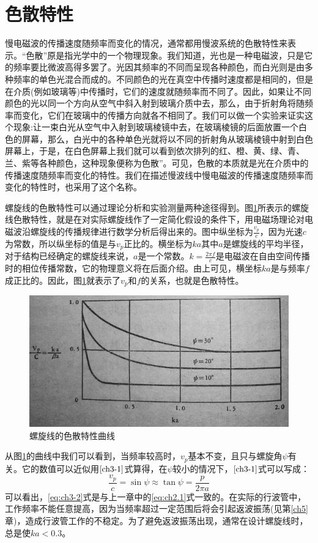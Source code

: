 \section{色散特性}
慢电磁波的传播速度随频率而变化的情况，通常都用慢波系统的色散特性来表示。“色散”原是指光学中的一个物理现象。我们知道，光也是一种电磁波，只是它的频率要比微波高得多罢了。光因其频率的不同而呈现各种颜色，而白光则是由多种频率的单色光混合而成的。不同颜色的光在真空中传播时速度都是相同的，但是在介质(例如玻璃等)中传播时，它们的速度就随频率而不同了。因此，如果让不同颜色的光以同一个方向从空气中斜入射到玻璃介质中去，那么，由于折射角将随频率而变化，它们在玻璃中的传播方向就各不相同了。我们可以做一个实验来证实这个现象:让一束白光从空气中入射到玻璃棱镜中去，在玻璃棱镜的后面放置一个白色的屏幕，那么，白光中的各种单色光就将以不同的折射角从玻璃棱镜中射到白色屏幕上，于是，在白色屏幕上我们就可以看到依次排列的红、橙、黄、绿、青、兰、紫等各种颜色，这种现象便称为色散”。可见，色散的本质就是光在介质中的传播速度随频率而变化的特性。我们在描述慢波线中慢电磁波的传播速度随频率而变化的特性时，也采用了这个名称。

螺旋线的色散特性可以通过理论分析和实验测量两种途径得到。图\ref{ch3-2}所表示的螺旋线色散特性，就是在对实际螺旋线作了一定简化假设的条件下，用电磁场理论对电磁波沿螺旋线的传播规律进行数学分析后得出来的。图中纵坐标为$ \frac{v_p}{c} $，因为光速$ c $为常数，所以纵坐标的值是与$ v_p $正比的。横坐标为$ ka $其中$ a $是螺旋线的平均半径，对于结构已经确定的螺旋线来说，$ a $是一个常数。$ k=\frac{2\pi f}{c} $是电磁波在自由空间传播时的相位传播常数，它的物理意义将在后面介绍。由上可见，横坐标$ ka $是与频率$ f $成正比的。因此，图\ref{ch3-2}就表示了$ v_p $和$ f $的关系，也就是色散特性。
\begin{figure}[phtb]
	\centering
	\includegraphics[width=0.65\linewidth]{figure/ch3-2}
	\caption{螺旋线的色散特性曲线}
	\label{ch3-2}
\end{figure}

从图\ref{ch3-2}的曲线中我们可以看到，当频率较高时，$ v_p $基本不变，且只与螺旋角$ \psi $有关。它的数值可以近似用$ \ref{ch3-1} $式算得，在$ \psi $较小的情况下，$ \ref{ch3-1} $式可以写成：
\begin{equation} \label{eq:ch3-2}
	\frac{v_p}{c}= \sin \psi \approx \tan\psi = \frac{p}{2\pi a}
\end{equation}
可以看出，\ref{eq:ch3-2}式是与上一章中的\ref{eq:ch2.1}式一致的。在实际的行波管中，工作频率不能任意提高，因为当频率超过一定范围后将会引起返波振荡(见第\ref{ch5}章)，造成行波管工作的不稳定。为了避免返波振荡出现，通常在设计螺旋线时，总是使$ ka < 0.3 $。

